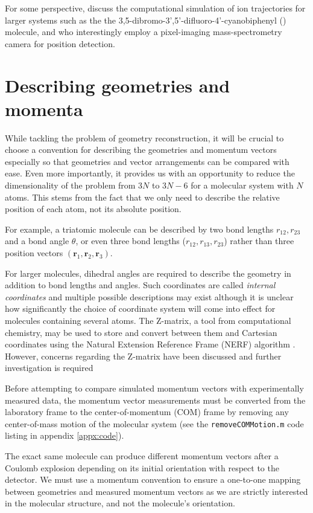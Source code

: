 For some perspective, \citet{Slater15} discuss the computational simulation of ion trajectories for larger systems such as the the 3,5-dibromo-3',5'-difluoro-4'-cyanobiphenyl () molecule, and who interestingly employ a pixel-imaging mass-spectrometry camera for position detection.

\section{Describing geometries and momenta} \label{sec:conventions}
While tackling the problem of geometry reconstruction, it will be crucial to choose a convention for describing the geometries and momentum vectors especially so that geometries and vector arrangements can be compared with ease. Even more importantly, it provides us with an opportunity to reduce the dimensionality of the problem from $3N$ to $3N-6$ for a molecular system with $N$ atoms. This stems from the fact that we only need to describe the relative position of each atom, not its absolute position.

For example, a triatomic molecule can be described by two bond lengths $r_{12}, r_{23}$ and a bond angle $\theta$, or even three bond lengths ($r_{12}, r_{13}, r_{23}$) rather than three position vectors $(\mathbf{r}_1, \mathbf{r}_2, \mathbf{r}_3)$.

For larger molecules, dihedral angles are required to describe the geometry in addition to bond lengths and angles. Such coordinates are called \emph{internal coordinates} and multiple possible descriptions may exist \citep{Peng96} although it is unclear how significantly the choice of coordinate system will come into effect for molecules containing several atoms. The Z-matrix, a tool from computational chemistry, may be used to store and convert between them and Cartesian coordinates using the Natural Extension Reference Frame (NERF) algorithm \citep{Parsons05}. However, concerns regarding the Z-matrix have been discussed \citep{Baker91,Baker96} and further investigation is required 

Before attempting to compare simulated momentum vectors with experimentally measured data, the momentum vector measurements must be converted from the laboratory frame to the center-of-momentum (COM) frame by removing any center-of-mass motion of the molecular system (see the \texttt{removeCOMMotion.m} code listing in appendix \ref{appx:code}).

The exact same molecule can produce different momentum vectors after a Coulomb explosion depending on its initial orientation with respect to the detector. We must use a momentum convention to ensure a one-to-one mapping between geometries and measured momentum vectors as we are strictly interested in the molecular structure, and not the molecule's orientation.

